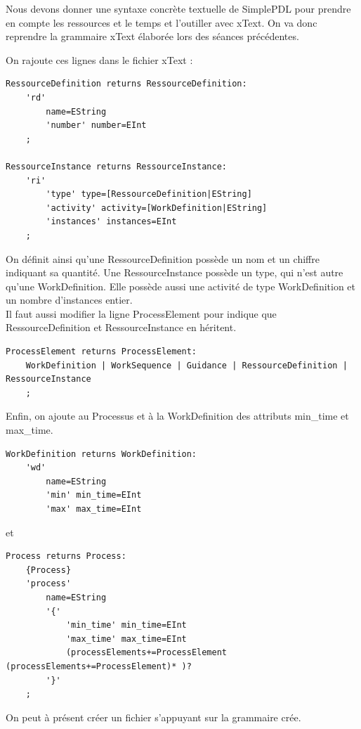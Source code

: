 \documentclass{report}
\begin{document}
Nous devons donner une syntaxe concrète textuelle de SimplePDL pour prendre en compte les ressources
et le temps et l’outiller avec xText. On va donc reprendre la grammaire xText élaborée lors des séances précédentes.

On rajoute ces lignes dans le fichier xText :\\

\begin{verbatim}
RessourceDefinition returns RessourceDefinition:
	'rd'
		name=EString
		'number' number=EInt
	;

RessourceInstance returns RessourceInstance:
	'ri'
		'type' type=[RessourceDefinition|EString]
		'activity' activity=[WorkDefinition|EString]
		'instances' instances=EInt
	;
\end{verbatim}

On définit ainsi qu'une RessourceDefinition possède un nom et un chiffre indiquant sa quantité. Une RessourceInstance possède un type, qui n'est autre qu'une WorkDefinition.
Elle possède aussi une activité de type WorkDefinition et un nombre d'instances entier.\\

Il faut aussi modifier la ligne ProcessElement pour indique que RessourceDefinition et RessourceInstance en héritent.


\begin{verbatim}
ProcessElement returns ProcessElement:
	WorkDefinition | WorkSequence | Guidance | RessourceDefinition | RessourceInstance
	;
\end{verbatim}

Enfin, on ajoute au Processus et à la WorkDefinition des attributs min\_time et max\_time.

\begin{verbatim}
WorkDefinition returns WorkDefinition:
	'wd'
		name=EString
		'min' min_time=EInt
		'max' max_time=EInt
\end{verbatim}

et

\begin{verbatim}
Process returns Process:
	{Process}
	'process'
		name=EString
		'{'
			'min_time' min_time=EInt
			'max_time' max_time=EInt
			(processElements+=ProcessElement (processElements+=ProcessElement)* )?
		'}'
	;
\end{verbatim}

On peut à présent créer un fichier s'appuyant sur la grammaire crée.
\end{document}
